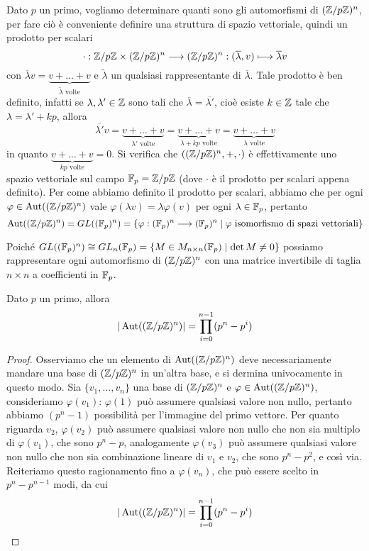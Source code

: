 \documentclass[11pt]{scrartcl}
\begin{document}
Dato $p$ un primo, vogliamo determinare quanti sono gli automorfismi di 
$({\mathbb Z}/p{\mathbb Z})^n$, per fare ciò è conveniente definire una struttura di spazio vettoriale,
quindi un prodotto per scalari\[
    \cdot:{\mathbb Z}/p{\mathbb Z}\times ({\mathbb Z}/p{\mathbb Z})^n \longrightarrow ({\mathbb Z}/p{\mathbb Z})^n : 
    (\overline{\lambda}, v)\longmapsto \overline{\lambda}v
\]
con $\overline{\lambda}v = \underset{\tilde{\lambda}\text{ volte}}{\underbrace{v + \ldots + v}}$
e $\tilde{\lambda}$ un qualsiasi rappresentante di $\overline{\lambda}$.
Tale prodotto è ben definito, infatti se $\lambda, \lambda' \in \mathbb Z$ sono tali che
$\overline{\lambda} = \overline{\lambda'}$, cioè esiste $k \in \mathbb Z$ tale che
$\lambda = \lambda' + kp$, allora \[
    \overline{\lambda'} v = \underset{\lambda'\text{ volte}}{\underbrace{v + \ldots + v}} = 
    \underset{\lambda + kp\text{ volte}}{\underbrace{v + \ldots + v}} = 
    \underset{\lambda\text{ volte}}{\underbrace{v + \ldots + v}}
\]in quanto $\underset{kp\text{ volte}}{\underbrace{v + \ldots + v}} = 0$. 
Si verifica che $(({\mathbb Z}/p{\mathbb Z})^n, +, \cdot)$ è effettivamente uno spazio vettoriale
sul campo $\mathbb F_p = {\mathbb Z}/p{\mathbb Z}$ (dove $\cdot$ è il prodotto per scalari appena definito).
Per come abbiamo definito il prodotto per scalari, abbiamo che per ogni
$\varphi \in \operatorname{Aut}(({\mathbb Z}/p{\mathbb Z})^n)$ vale $\varphi(\lambda v) = \lambda\varphi(v)$ 
per ogni $\lambda \in \mathbb F_p$, pertanto
\[
    \operatorname{Aut}(({\mathbb Z}/p{\mathbb Z})^n) = GL((\mathbb F_p)^n) = \{\varphi: (\mathbb F_p)^n\longrightarrow(\mathbb F_p)^n
    \mid\varphi\text{ isomorfismo di spazi vettoriali}\}
\]

Poiché $GL((\mathbb F_p)^n) \cong GL_n(\mathbb F_p) = \{M \in M_{n\times n}(\mathbb F_p)\mid \det M \neq 0\}$
possiamo rappresentare ogni automorfismo di $({\mathbb Z}/p{\mathbb Z})^n$ con una matrice invertibile
di taglia $n\times n$ a coefficienti in $\mathbb F_p$.

\begin{proposition}
Dato $p$ un primo, allora \[
    |\operatorname{Aut}(({\mathbb Z}/p{\mathbb Z})^n)| = \prod_{i = 0}^{n - 1} (p^n - p^i)
    \]
\end{proposition}

\begin{proof}
    Osserviamo che un elemento di $\operatorname{Aut}(({\mathbb Z}/p{\mathbb Z})^n)$ deve necessariamente mandare 
    una base di $({\mathbb Z}/p{\mathbb Z})^n$ in un'altra base, e si dermina univocamente in questo 
    modo. Sia $\{v_1, \ldots, v_n\}$ una base di $({\mathbb Z}/p{\mathbb Z})^n$ e $\varphi \in 
    \operatorname{Aut}(({\mathbb Z}/p{\mathbb Z})^n)$, consideriamo $\varphi(v_1)$: $\varphi(1)$ può assumere
    qualsiasi valore non nullo, pertanto abbiamo $(p^n - 1)$ possibilità per 
    l'immagine del primo vettore. Per quanto riguarda $v_2$, $\varphi(v_2)$
    può assumere qualsiasi valore non nullo che non sia multiplo di $\varphi(v_1)$,
    che sono $p^n - p$, analogamente $\varphi(v_3)$ può assumere qualsiasi
    valore non nullo che non sia combinazione lineare di $v_1$ e $v_2$, che sono
    $p^n - p^2$, e così via. Reiteriamo questo ragionamento fino a $\varphi(v_n)$,
    che può essere scelto in $p^n - p^{n - 1}$ modi, da cui \[
        |\operatorname{Aut}(({\mathbb Z}/p{\mathbb Z})^n)| = \prod_{i = 0}^{n - 1}(p^n - p^i)
    \]
\end{proof}
\end{document}
